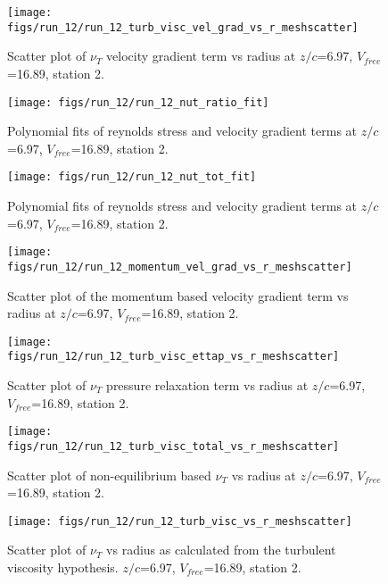 \begin{figure}[H]
\centering
\texttt{[image: figs/run\_12/run\_12\_turb\_visc\_vel\_grad\_vs\_r\_meshscatter]}
\caption{Scatter plot of $\nu_T$ velocity gradient term vs radius at $z/c$=6.97, $V_{free}$=16.89, station 2.}
\end{figure}


\begin{figure}[H]
\centering
\texttt{[image: figs/run\_12/run\_12\_nut\_ratio\_fit]}
\caption{Polynomial fits of reynolds stress and velocity gradient terms at $z/c$=6.97, $V_{free}$=16.89, station 2.}
\end{figure}


\begin{figure}[H]
\centering
\texttt{[image: figs/run\_12/run\_12\_nut\_tot\_fit]}
\caption{Polynomial fits of reynolds stress and velocity gradient terms at $z/c$=6.97, $V_{free}$=16.89, station 2.}
\end{figure}


\begin{figure}[H]
\centering
\texttt{[image: figs/run\_12/run\_12\_momentum\_vel\_grad\_vs\_r\_meshscatter]}
\caption{Scatter plot of the momentum based velocity gradient term vs radius at $z/c$=6.97, $V_{free}$=16.89, station 2.}
\end{figure}


\begin{figure}[H]
\centering
\texttt{[image: figs/run\_12/run\_12\_turb\_visc\_ettap\_vs\_r\_meshscatter]}
\caption{Scatter plot of $\nu_T$ pressure relaxation term vs radius at $z/c$=6.97, $V_{free}$=16.89, station 2.}
\end{figure}


\begin{figure}[H]
\centering
\texttt{[image: figs/run\_12/run\_12\_turb\_visc\_total\_vs\_r\_meshscatter]}
\caption{Scatter plot of non-equilibrium based $\nu_T$ vs radius at $z/c$=6.97, $V_{free}$=16.89, station 2.}
\end{figure}


\begin{figure}[H]
\centering
\texttt{[image: figs/run\_12/run\_12\_turb\_visc\_vs\_r\_meshscatter]}
\caption{Scatter plot of $\nu_T$ vs radius as calculated from the turbulent viscosity hypothesis. $z/c$=6.97, $V_{free}$=16.89, station 2.}
\end{figure}



